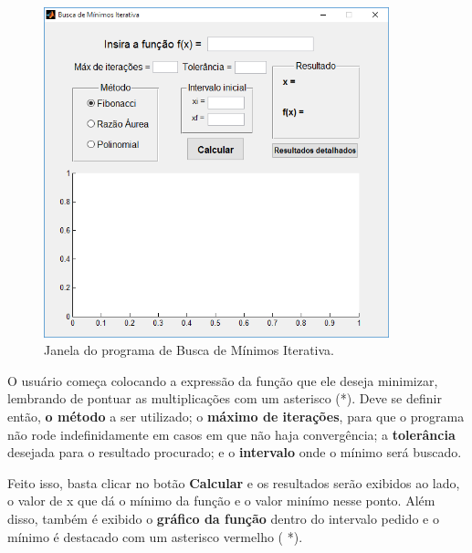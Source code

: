 \begin{figure}[H]
	\begin{center}
		\includegraphics[width=10cm]{../gui/gui.png}   
		\caption{Janela do programa de Busca de Mínimos Iterativa.}
		\label{fig:gui}
	\end{center}
\end{figure}

\par O usuário começa colocando a expressão da função que ele deseja minimizar, lembrando de pontuar as multiplicações com um asterisco (*). Deve se definir então, \textbf{o método} a ser utilizado; o \textbf{máximo de iterações}, para que o programa não rode indefinidamente em casos em que não haja convergência; a \textbf{tolerância} desejada para o resultado procurado; e o \textbf{intervalo} onde o mínimo será buscado. \\

\par Feito isso, basta clicar no botão \textbf{Calcular} e os resultados serão exibidos ao lado, o valor de x que dá o mínimo da função e o valor minímo nesse ponto. Além disso, também é exibido o \textbf{gráfico da função} dentro do intervalo pedido e o mínimo é destacado com um asterisco vermelho ({\color{red} *}). \\
